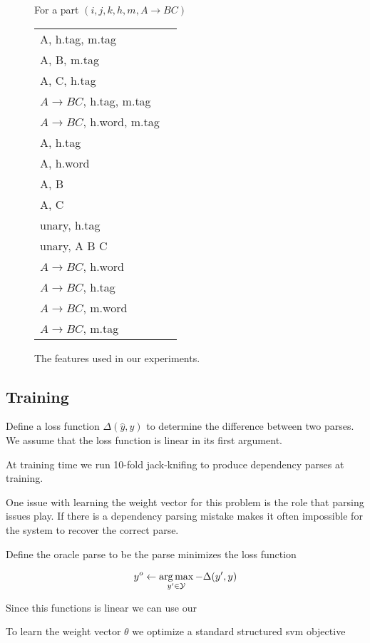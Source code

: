 \documentclass[11pt,letterpaper]{article}
\begin{document}
\begin{figure}
  \centering
  For a part $(i, j, k, h, m, A \rightarrow B C)$
  \begin{tabular}{ll}
    A, h.tag, m.tag \\
  A, B, m.tag \\
  A, C, h.tag \\
  $A \rightarrow B C$, h.tag, m.tag \\
  $A \rightarrow B C$, h.word, m.tag \\
  A, h.tag \\
  A, h.word \\
  A, B \\
  A, C \\
  unary, h.tag \\
  unary, A B C\\
  $A \rightarrow B C$, h.word \\
  $A \rightarrow B C$, h.tag \\
  $A \rightarrow B C$, m.word \\
  $A \rightarrow B C$, m.tag \\
  \end{tabular}

  \label{fig:features}
  \caption{The features used in our experiments.}
\end{figure}

\subsection{Training}


Define a loss function $ \Delta(\hat{y}, y)$ to determine the difference between two parses.
We assume that  the loss function is linear in its first argument.


At training time we run 10-fold jack-knifing to produce dependency parses at training.

One issue with learning the weight vector for this problem is the role that
parsing issues play. If there is a dependency parsing mistake makes it often impossible
for the system to recover the correct parse.

Define the oracle parse to be the parse minimizes the loss function

\[ y^o \gets \operatorname*{arg\,max}_{y' \in \mathcal{Y}} -\Delta(y', y) \]

Since this functions is linear we can use our

To learn the weight vector $\theta$ we optimize a standard structured svm objective
\end{document}
